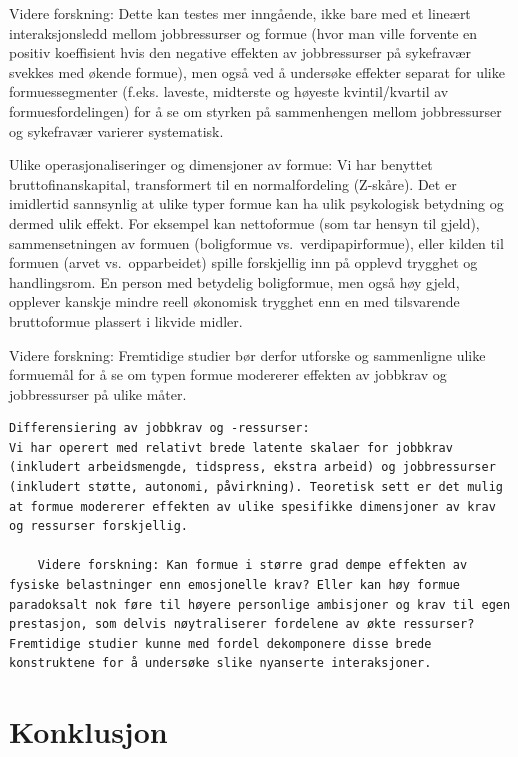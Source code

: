 \documentclass[
  12pt,
  a4paper,
  DIV=11,
  numbers=noendperiod]{scrartcl}
\begin{document}
Videre forskning: Dette kan testes mer inngående, ikke bare med et
lineært interaksjonsledd mellom jobbressurser og formue (hvor man ville
forvente en positiv koeffisient hvis den negative effekten av
jobbressurser på sykefravær svekkes med økende formue), men også ved å
undersøke effekter separat for ulike formuessegmenter (f.eks. laveste,
midterste og høyeste kvintil/kvartil av formuesfordelingen) for å se om
styrken på sammenhengen mellom jobbressurser og sykefravær varierer
systematisk.

Ulike operasjonaliseringer og dimensjoner av formue: Vi har benyttet
bruttofinanskapital, transformert til en normalfordeling (Z-skåre). Det
er imidlertid sannsynlig at ulike typer formue kan ha ulik psykologisk
betydning og dermed ulik effekt. For eksempel kan nettoformue (som tar
hensyn til gjeld), sammensetningen av formuen (boligformue
vs.~verdipapirformue), eller kilden til formuen (arvet vs.~opparbeidet)
spille forskjellig inn på opplevd trygghet og handlingsrom. En person
med betydelig boligformue, men også høy gjeld, opplever kanskje mindre
reell økonomisk trygghet enn en med tilsvarende bruttoformue plassert i
likvide midler.

Videre forskning: Fremtidige studier bør derfor utforske og sammenligne
ulike formuemål for å se om typen formue modererer effekten av jobbkrav
og jobbressurser på ulike måter.

\begin{verbatim}
Differensiering av jobbkrav og -ressurser:
Vi har operert med relativt brede latente skalaer for jobbkrav (inkludert arbeidsmengde, tidspress, ekstra arbeid) og jobbressurser (inkludert støtte, autonomi, påvirkning). Teoretisk sett er det mulig at formue modererer effekten av ulike spesifikke dimensjoner av krav og ressurser forskjellig.

    Videre forskning: Kan formue i større grad dempe effekten av fysiske belastninger enn emosjonelle krav? Eller kan høy formue paradoksalt nok føre til høyere personlige ambisjoner og krav til egen prestasjon, som delvis nøytraliserer fordelene av økte ressurser? Fremtidige studier kunne med fordel dekomponere disse brede konstruktene for å undersøke slike nyanserte interaksjoner.
\end{verbatim}

\newpage

\section{Konklusjon}\label{konklusjon}
\end{document}

